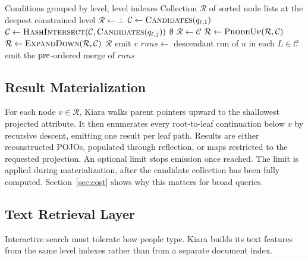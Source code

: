 \begin{algorithm}[t]
\caption{Adaptive Level-Wise Reduction}
\label{alg:reduction}
\begin{algorithmic}[1]
\Require Conditions grouped by level; level indexes
\Ensure Collection $\mathcal{R}$ of sorted node lists at the deepest constrained level
\State $\mathcal{R}\gets\bot$
  \State $\mathcal{C}\gets\textsc{Candidates}(q_{\ell,1})$ 
    \State $\mathcal{C}\gets\textsc{HashIntersect}(\mathcal{C},\textsc{Candidates}(q_{\ell,j}))$
  \EndFor
    \State \Return $\emptyset$
  \EndIf
    \State $\mathcal{R}\gets\mathcal{C}$
   
    \State $\mathcal{R}\gets\textsc{ProbeUp}(\mathcal{R},\mathcal{C})$
  \Else
    \State $\mathcal{R}\gets\textsc{ExpandDown}(\mathcal{R},\mathcal{C})$
  \EndIf
\EndFor
\State \Return $\mathcal{R}$
\Statex
{}
      \State emit $v$
    \EndIf
  \EndFor
\EndFunction
{}
    \State $\mathit{runs}\gets$ descendant run of $u$ in each $L\in\mathcal{C}$
    \State emit the $\mathrm{pre}$-ordered merge of $\mathit{runs}$
  \EndFor
\EndFunction
\end{algorithmic}
\end{algorithm}

\subsection{Result Materialization}
For each node $v\in\mathcal{R}$, Kiara walks parent pointers upward to the shallowest projected attribute. It then enumerates every root-to-leaf continuation below $v$ by recursive descent, emitting one result per leaf path. Results are either reconstructed POJOs, populated through reflection, or maps restricted to the requested projection. An optional limit stops emission once reached. The limit is applied during materialization, after the candidate collection has been fully computed. Section~\ref{sec:cost} shows why this matters for broad queries.

\subsection{Text Retrieval Layer}
\label{sec:text}
Interactive search must tolerate how people type. Kiara builds its text features from the same level indexes rather than from a separate document index.

